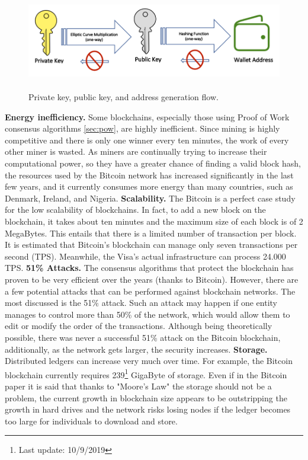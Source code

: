 \begin{figure}[h]
    \centering
    \includegraphics[height=4.3cm]{key_generation.png}
    \caption{Private key, public key, and address generation flow.\cite{key}}
    \label{fig:key}
\end{figure}\bigskip
\textbf{Energy inefficiency.}
Some blockchains, especially those using Proof of Work consensus algorithms \ref{sec:pow}, are 
highly inefficient. Since mining is highly competitive and there is 
only one winner every ten minutes, the work of every other miner is wasted.
As miners are continually trying to increase their computational power, 
so they have a greater chance of finding a valid block hash, the resources used 
by the Bitcoin network has increased significantly in the last few years, and it 
currently consumes more energy than many countries, such as Denmark, Ireland, 
and Nigeria.\cite{binancevision}
\bigskip 
\textbf{Scalability.}
The Bitcoin is a perfect case study for the low scalability of blockchains.
In fact, to add a new block on the blockchain, it takes about ten minutes and
the maximum size of each block is of 2 MegaBytes. This entails that there is a
limited number of transaction per block. It is estimated that Bitcoin's 
blockchain can manage only seven transactions per second (TPS). Meanwhile, the
Visa's actual infrastructure can process 24.000 TPS.\cite{investopedia}\pagebreak
\bigskip 
\textbf{51\% Attacks.}
The consensus algorithms that protect the blockchain has proven to be very 
efficient over the years (thanks to Bitcoin). However, there are a few potential attacks that can 
be performed against blockchain networks. The most discussed is the  51\% attack.
Such an attack may happen if one entity manages to control more than 50\% of the 
network, which would allow them to edit or modify the order of the transactions.
Although being theoretically possible, there was never a successful 51\% attack on 
the Bitcoin blockchain, additionally, as the network gets larger, the security 
increases.\cite{binancevision}
\bigskip 
\textbf{Storage.}
Distributed ledgers can increase very much over time. For example, the Bitcoin blockchain
currently requires 239\footnote{Last update: 10/9/2019} GigaByte of storage. Even if in 
the Bitcoin paper it is said that thanks to "Moore's Law"\cite{bitcoin} the storage should
not be a problem, the current growth in blockchain size appears to be outstripping the growth
in hard drives and the network risks losing nodes if the ledger becomes too large for 
individuals to download and store.\cite{binancevision}


